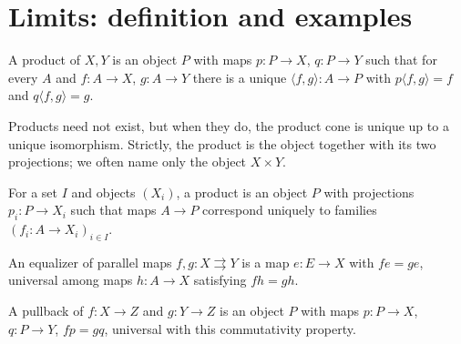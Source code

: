 \section{Limits: definition and examples}
\begin{definition}
\label{def:lbc-product}
A product of $X,Y$ is an object $P$ with maps $p:P\to X$, $q:P\to Y$ such
that for every $A$ and $f:A\to X$, $g:A\to Y$ there is a unique
$\langle f,g\rangle:A\to P$ with $p\langle f,g\rangle=f$ and
$q\langle f,g\rangle=g$.
\end{definition}

\begin{remark}
\label{rem:lbc-product-uniqueness}
Products need not exist, but when they do, the product cone is unique up to a
unique isomorphism. Strictly, the product is the object together with its two
projections; we often name only the object $X\times Y$.
\end{remark}

\begin{definition}
\label{def:lbc-family-product}
For a set $I$ and objects $(X_i)$, a product is an object $P$ with projections
$p_i:P\to X_i$ such that maps $A\to P$ correspond uniquely to families
$(f_i:A\to X_i)_{i\in I}$.
\end{definition}

\begin{definition}[Equalizer]
\label{def:lbc-equalizer}
An equalizer of parallel maps $f,g:X\rightrightarrows Y$ is a map
$e:E\to X$ with $fe=ge$, universal among maps $h:A\to X$ satisfying $fh=gh$.
\end{definition}

\begin{definition}[Pullback]
\label{def:lbc-pullback}
A pullback of $f:X\to Z$ and $g:Y\to Z$ is an object $P$ with maps
$p:P\to X$, $q:P\to Y$, $fp=gq$, universal with this commutativity property.
\end{definition}


